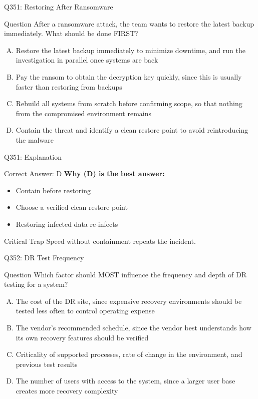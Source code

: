 \documentclass{beamer}
\begin{document}
	\begin{frame}{Q351: Restoring After Ransomware}
		\begin{block}{Question}
			\small After a ransomware attack, the team wants to restore the latest backup immediately. What should be done FIRST?
		\end{block}
		\begin{enumerate}[(A)]
			\footnotesize
			\item Restore the latest backup immediately to minimize downtime, and run the investigation in parallel once systems are back
			\item Pay the ransom to obtain the decryption key quickly, since this is usually faster than restoring from backups
			\item Rebuild all systems from scratch before confirming scope, so that nothing from the compromised environment remains
			\item Contain the threat and identify a clean restore point to avoid reintroducing the malware
		\end{enumerate}
	\end{frame}
	
	\begin{frame}{Q351: Explanation}
		\begin{block}{Correct Answer: D}
			\textbf{Why (D) is the best answer:}
			\begin{itemize}
				\item Contain before restoring
				\item Choose a verified clean restore point
				\item Restoring infected data re-infects
			\end{itemize}
		\end{block}
		\begin{alertblock}{Critical Trap}
			Speed without containment repeats the incident.
		\end{alertblock}
	\end{frame}
	
	\begin{frame}{Q352: DR Test Frequency}
		\begin{block}{Question}
			\small Which factor should MOST influence the frequency and depth of DR testing for a system?
		\end{block}
		\begin{enumerate}[(A)]
			\footnotesize
			\item The cost of the DR site, since expensive recovery environments should be tested less often to control operating expense
			\item The vendor's recommended schedule, since the vendor best understands how its own recovery features should be verified
			\item Criticality of supported processes, rate of change in the environment, and previous test results
			\item The number of users with access to the system, since a larger user base creates more recovery complexity
		\end{enumerate}
	\end{frame}
	
\end{document}
